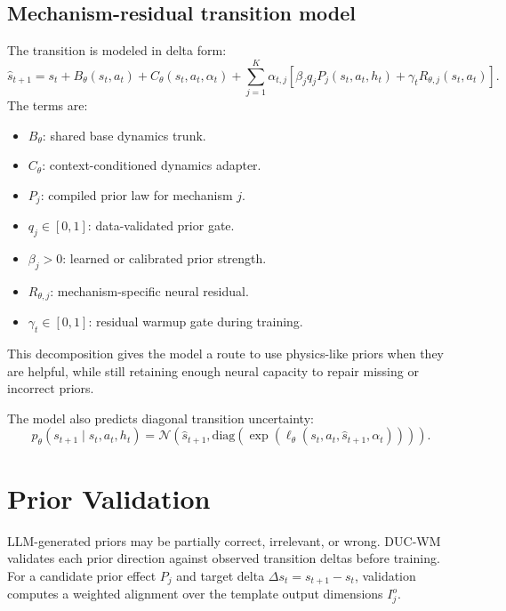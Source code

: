 \documentclass[11pt]{article}
\newcommand{\diag}{\mathrm{diag}}
\begin{document}
\subsection{Mechanism-residual transition model}

The transition is modeled in delta form:
\begin{equation}
    \hat s_{t+1}
    =
    s_t
    +
    B_\theta(s_t,a_t)
    +
    C_\theta(s_t,a_t,\alpha_t)
    +
    \sum_{j=1}^{K}
    \alpha_{t,j}
    \left[
        \beta_j q_j P_j(s_t,a_t,h_t)
        +
        \gamma_t R_{\theta,j}(s_t,a_t)
    \right].
    \label{eq:duc-transition}
\end{equation}
The terms are:
\begin{itemize}[leftmargin=1.5em]
    \item $B_\theta$: shared base dynamics trunk.
    \item $C_\theta$: context-conditioned dynamics adapter.
    \item $P_j$: compiled prior law for mechanism $j$.
    \item $q_j \in [0,1]$: data-validated prior gate.
    \item $\beta_j > 0$: learned or calibrated prior strength.
    \item $R_{\theta,j}$: mechanism-specific neural residual.
    \item $\gamma_t \in [0,1]$: residual warmup gate during training.
\end{itemize}
This decomposition gives the model a route to use physics-like priors when they are helpful, while still retaining enough neural capacity to repair missing or incorrect priors.

The model also predicts diagonal transition uncertainty:
\begin{equation}
    p_\theta(s_{t+1} \mid s_t,a_t,h_t)
    =
    \mathcal{N}
    \left(
        \hat s_{t+1},
        \diag(\exp(\ell_\theta(s_t,a_t,\hat s_{t+1},\alpha_t)))
    \right).
\end{equation}

\section{Prior Validation}

LLM-generated priors may be partially correct, irrelevant, or wrong. DUC-WM validates each prior direction against observed transition deltas before training. For a candidate prior effect $P_j$ and target delta $\Delta s_t=s_{t+1}-s_t$, validation computes a weighted alignment over the template output dimensions $I^o_j$.
\end{document}
